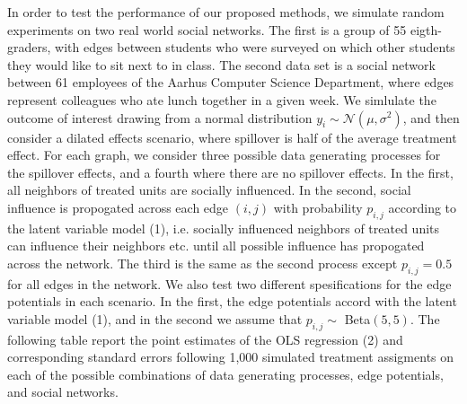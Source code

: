 \documentclass{article}
\begin{document}
In order to test the performance of our proposed methods, we simulate random experiments on two real world social networks. The first is a group of 55 eigth-graders, with edges between 
students who were surveyed on which other students they would like to sit next to in class. The second data set is a social network between 61 employees of the Aarhus Computer Science Department, where 
edges represent colleagues who ate lunch together in a given week. We simlulate the outcome of interest drawing from a normal distribution $y_{i} \sim \mathcal{N}(\mu, \sigma^2)$, and then consider a dilated effects scenario, 
where spillover is half of the average treatment effect. For each graph, we consider three possible data generating processes for the spillover effects, and a fourth where there are no spillover effects. In the first, all neighbors of treated units are socially influenced. 
In the second, social influence is propogated across each edge $(i, j)$ with probability $p_{i,j}$ according to the latent variable model (1), i.e. socially influenced neighbors of treated units can influence their neighbors etc. until all possible influence
has propogated across the network. The third is the same as the second process except $p_{i,j} = 0.5$ for all edges in the network. We also test two different spesifications for the edge potentials in each scenario. In the first, the edge potentials accord with the latent variable model (1), and in the second we assume that $p_{i,j} \sim$ Beta$(5, 5)$. The following table report the point estimates of the OLS regression (2) and corresponding standard errors following 1,000 simulated 
treatment assigments on each of the possible combinations of data generating processes, edge potentials, and social networks. 
\end{document}
